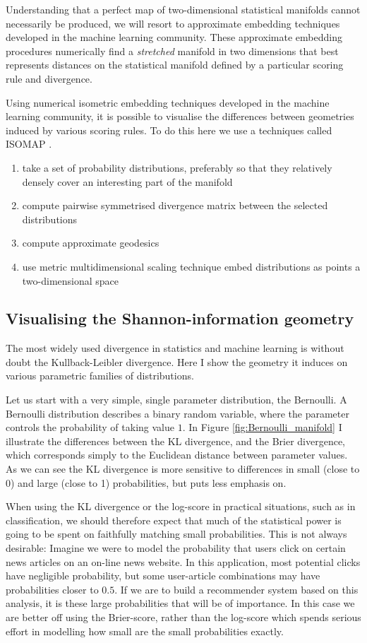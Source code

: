 Understanding that a perfect map of two-dimensional statistical manifolds cannot necessarily be produced, we will resort to approximate embedding techniques developed in the machine learning community. These approximate embedding procedures numerically find a \emph{stretched} manifold in two dimensions that best represents distances on the statistical manifold defined by a particular scoring rule and divergence.

Using numerical isometric embedding techniques developed in the machine learning community, it is possible to visualise the differences between geometries induced by various scoring rules. To do this here we use a techniques called ISOMAP \cite{isomap}.

\begin{enumerate}
\item take a set of probability distributions, preferably so that they relatively densely cover an interesting part of the manifold
\item compute pairwise symmetrised divergence matrix between the selected distributions
\item compute approximate geodesics
\item use metric multidimensional scaling technique embed distributions as points a two-dimensional space
\end{enumerate}

\subsection{Visualising the Shannon-information geometry}

The most widely used divergence in statistics and machine learning is without doubt the Kullback-Leibler divergence. Here I show the geometry it induces on various parametric families of distributions.

Let us start with a very simple, single parameter distribution, the Bernoulli. A Bernoulli distribution describes a binary random variable, where the parameter controls the probability of taking value $1$. In Figure \ref{fig:Bernoulli_manifold} I illustrate the differences between the KL divergence, and the Brier divergence, which corresponds simply to the Euclidean distance between parameter values. As we can see the KL divergence is more sensitive to differences in small (close to 0) and large (close to 1) probabilities, but puts less emphasis on.

When using the KL divergence or the log-score in practical situations, such as in classification, we should therefore expect that much of the statistical power is going to be spent on faithfully matching small probabilities. This is not always desirable: Imagine we were to model the probability that users click on certain news articles on an on-line news website. In this application, most potential clicks have negligible probability, but some user-article combinations may have probabilities closer to $0.5$. If we are to build a recommender system based on this analysis, it is these large probabilities that will be of importance. In this case we are better off using the Brier-score, rather than the log-score which spends serious effort in modelling how small are the small probabilities exactly.


